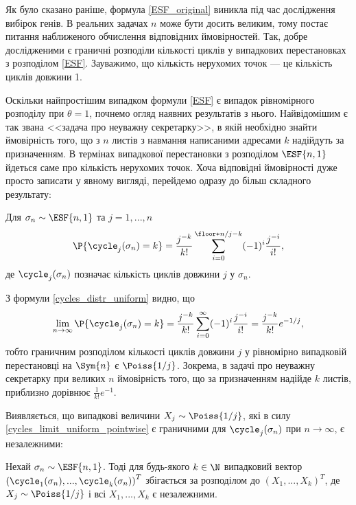 Як було сказано раніше, формула \eqref{ESF_original}
виникла під час дослідження вибірок генів.
В реальних задачах $n$ може бути досить великим,
тому постає питання наближеного обчислення відповідних ймовірностей.
Так, добре дослідженими є граничні розподіли кількості циклів
у випадкових перестановках з розподілом \eqref{ESF}.
Зауважимо, що кількість нерухомих точок --- це кількість
циклів довжини 1.

Оскільки найпростішим випадком формули \eqref{ESF} є випадок рівномірного
розподілу при $\theta = 1$, почнемо огляд наявних результатів з нього.
Найвідомішим є так звана <<задача про неуважну секретарку>>,
в якій необхідно знайти ймовірність того, що з $n$ листів з
навмання написаними адресами $k$ надійдуть за призначенням.
В термінах випадкової перестановки з розподілом
$\ESF{n, 1}$ йдеться саме про кількість нерухомих точок. Хоча відповідні
ймовірності дуже просто записати у явному вигляді, перейдемо одразу
до більш складного результату:
\begin{theorem}
    Для $\sigma_n \sim \ESF{n, 1}$ та $j = 1,...,n$ 
    \begin{gather}\label{cycles_distr_uniform}
        \P{\cycle_j(\sigma_n) = k} = \frac{j^{-k}}{k!} \sum_{i=0}^{
            \floor*{n/j} - k
        } (-1)^i \frac{j^{-i}}{i!},
    \end{gather}
    де $\cycle_j(\sigma_n)$ позначає кількість
    циклів довжини $j$ у $\sigma_n$.
\end{theorem}
З формули \eqref{cycles_distr_uniform} видно,
що 
\begin{gather}\label{cycles_limit_uniform_pointwise}
    \lim_{n\to\infty} \P{\cycle_j(\sigma_n) = k} = 
    \frac{j^{-k}}{k!} \sum_{i=0}^{\infty} (-1)^i \frac{j^{-i}}{i!} = 
    \frac{j^{-k}}{k!} e^{-1/j},
\end{gather}
тобто граничним розподілом кількості
циклів довжини $j$ у
рівномірно випадковій перестановці на $\Sym{n}$
є $\Poiss{1/j}$.
Зокрема, в задачі про неуважну секретарку
при великих $n$ ймовірність того, що за призначенням
надійде $k$ листів, приблизно дорівнює
$\frac{1}{k!} e^{-1}$. 

Виявляється, що випадкові величини $X_j \sim \Poiss{1/j}$,
які в силу \eqref{cycles_limit_uniform_pointwise}
є граничними для $\cycle_j(\sigma_n)$ при $n\to\infty$,
є незалежними:

\begin{theorem}\label{cycles_limit_uniform_joint}
    Нехай $\sigma_n \sim \ESF{n, 1}$. Тоді
    для будь-якого $k \in \N$
    випадковий вектор 
    $\left(\cycle_{1}(\sigma_n), ..., \cycle_{k}(\sigma_n)\right)^T$
    збігається за розподілом до
    $\left(X_{1}, ..., X_{k}\right)^T$,
    де $X_{j} \sim \Poiss{1/{j}}$ і 
    всі $X_{1}, ..., X_{k}$ є незалежними.
\end{theorem}

